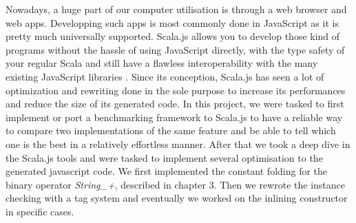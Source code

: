 Nowadays, a huge part of our computer utilisation is through a web browser and
web apps.
Developping such apps is most commonly done in JavaScript as it is pretty much
universally supported. Scala.js allows you to develop those kind of programs
without the hassle of using JavaScript directly, with the type safety of your
regular Scala and still have a flawless interoperability with the many existing
JavaScript libraries \cite{scalajsInterop}.
Since its conception, Scala.js has seen a lot of optimization and rewriting
done in the sole purpose to increase its performances and reduce the size of
its generated code.
In this project, we were tasked to first implement or port a benchmarking
framework to Scala.js to have a reliable way to compare two implementations of
the same feature and be able to tell which one is the best in a relatively
effortless manner.
After that we took a deep dive in the Scala.js tools and were tasked to
implement several optimisation to the generated javascript code. We first
implemented the constant folding for the binary operator \emph{String\_+},
described in chapter 3. Then we rewrote the instance checking with a tag system
and eventually we worked on the inlining constructor in specific cases.